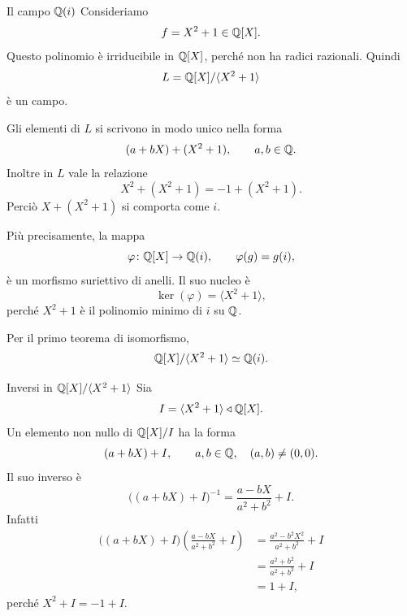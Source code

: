 \documentclass[a4paper]{article}
\begin{document}
\begin{radioactive}
\begin{snippetexample}{Il campo \(\mathbb{Q}(i)\)}
    Consideriamo
    \[
        f=X^2+1\in\mathbb{Q}[X].
    \]
    Questo polinomio è irriducibile in \(\mathbb{Q}[X]\), perché non ha radici razionali. Quindi
    \[
        L=\mathbb{Q}[X]/\langle X^2+1 \rangle
    \]
    è un campo.

    Gli elementi di \(L\) si scrivono in modo unico nella forma
    \[
        (a+bX)+(X^2+1),
        \qquad
        a,b\in\mathbb{Q}.
    \]
    Inoltre in \(L\) vale la relazione
    \[
        X^2+(X^2+1)=-1+(X^2+1).
    \]
    Perciò \(X+(X^2+1)\) si comporta come \(i\).

    Più precisamente, la mappa
    \[
        \varphi\colon \mathbb{Q}[X]\to \mathbb{Q}(i),
        \qquad
        \varphi(g)=g(i),
    \]
    è un morfismo suriettivo di anelli. Il suo nucleo è
    \[
        \ker(\varphi)=\langle X^2+1 \rangle,
    \]
    perché \(X^2+1\) è il polinomio minimo di \(i\) su \(\mathbb{Q}\).

    Per il primo teorema di isomorfismo,
    \[
        \mathbb{Q}[X]/\langle X^2+1 \rangle
        \simeq
        \mathbb{Q}(i).
    \]
\end{snippetexample}
\end{radioactive}

\begin{radioactive}
\begin{snippetexample}{Inversi in \(\mathbb{Q}[X]/\langle X^2+1 \rangle\)}
    Sia
    \[
        I=\langle X^2+1 \rangle\triangleleft \mathbb{Q}[X].
    \]
    Un elemento non nullo di \(\mathbb{Q}[X]/I\) ha la forma
    \[
        (a+bX)+I,
        \qquad
        a,b\in\mathbb{Q},
        \quad
        (a,b)\neq (0,0).
    \]
    Il suo inverso è
    \[
        \big((a+bX)+I\big)^{-1}
        =
        \frac{a-bX}{a^2+b^2}+I.
    \]
    Infatti
    \begin{align*}
        \big((a+bX)+I\big)\left(\frac{a-bX}{a^2+b^2}+I\right)
        &=
        \frac{a^2-b^2X^2}{a^2+b^2}+I \\
        &=
        \frac{a^2+b^2}{a^2+b^2}+I \\
        &=
        1+I,
    \end{align*}
    perché \(X^2+I=-1+I\).
\end{snippetexample}
\end{radioactive}
\end{document}
